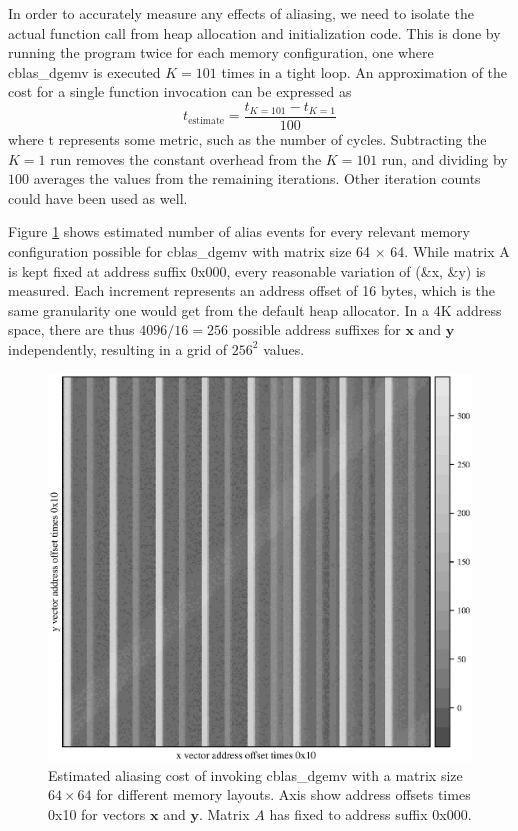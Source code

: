 \documentclass[a4paper,10pt,twocolumn,twoside]{article}
\begin{document}
In order to accurately measure any effects of aliasing, we need to isolate the actual function call from heap allocation and initialization code.
This is done by running the program twice for each memory configuration, one where cblas\_dgemv is executed $K = 101$ times in a tight loop.
An approximation of the cost for a single function invocation can be expressed as 
$$
t_{\text{estimate}}=\frac{t_{K=101}-t_{K=1}}{100}
$$
where t represents some metric, such as the number of cycles.
Subtracting the $K = 1$ run removes the constant overhead from the $K = 101$ run, and dividing by $100$ averages the values from the remaining iterations.
Other iteration counts could have been used as well.

Figure \ref{fig:heatmap} shows estimated number of alias events for every relevant memory configuration possible for cblas\_dgemv with matrix size 64 $\times$ 64. 
While matrix A is kept fixed at address suffix 0x000, every reasonable variation of (\&x, \&y) is measured.
Each increment represents an address offset of 16 bytes, which is the same granularity one would get from the default heap allocator.
In a 4K address space, there are thus $4096/16 = 256$ possible address suffixes for $\boldsymbol{x}$ and $\boldsymbol{y}$ independently, resulting in a grid of $256^2$ values.

\begin{figure}[h]
  \caption{Estimated aliasing cost of invoking cblas\_dgemv with a matrix size $64 \times 64$ for different memory layouts. Axis show address offsets times 0x10 for vectors $\boldsymbol{x}$ and $\boldsymbol{y}$. Matrix $A$ has fixed to address suffix 0x000.}
  \label{fig:heatmap}
  \includegraphics[width=\columnwidth]{resources/heatmap.eps}
\end{figure}
\end{document}
